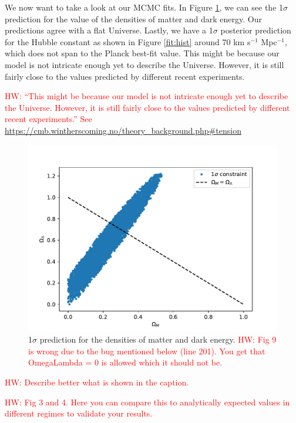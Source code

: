 \documentclass{aa}
\newcommand{\hw}[1]{\textcolor{red}{HW: #1}}
\begin{document}
We now want to take a look at our MCMC fits. In Figure \ref{fig:fitting}, we can see the 1$\sigma$ prediction for the value of the densities of matter and dark energy. Our predictions agree with a flat Universe. Lastly, we have a 1$\sigma$ posterior prediction for the Hubble constant as shown in Figure \ref{fit:hist} around 70 km s$^{-1}$ Mpc$^{-1}$, which does not span to the Planck best-fit value. This might be because our model is not intricate enough yet to describe the Universe. However, it is still fairly close to the values predicted by different recent experiments.

\hw{“This might be because our model is not intricate enough yet to describe the Universe. However, it is still fairly close to the values predicted by different recent experiments.”  See \url{https://cmb.wintherscoming.no/theory_background.php#tension}}

\begin{figure}[ht]
\centering
\includegraphics[width=\hsize]{figures/fitting.pdf}
  \caption{1$\sigma$ prediction for the densities of matter and dark energy. \hw{Fig 9 is wrong due to the bug mentioned below (line 201). You get that OmegaLambda = 0 is allowed which it should not be.}}
     \label{fig:fitting}
\end{figure}

\hw{Describe better what is shown in the caption.}

\hw{Fig 3 and 4. Here you can compare this to analytically expected values in different regimes to validate your results.}
\end{document}
